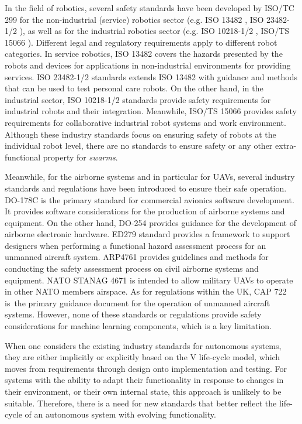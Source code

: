 \documentclass[sigconf]{acmart}
\begin{document}
 
In the field of robotics, several safety standards have been developed by ISO/TC 299 for the non-industrial (service) robotics sector (e.g. ISO 13482 \cite{ISO13482}, ISO 23482-1/2 \cite{ISO23482-1,ISO23482-2}), as well as for the industrial robotics sector (e.g. ISO 10218-1/2 \cite{ISO10218-1,ISO10218-2}, ISO/TS 15066 \cite{ISO15066}). 
Different legal and regulatory requirements apply to different robot categories. 
In service robotics, ISO 13482 covers the hazards presented by the robots and devices for applications in non-industrial environments for providing services. %
ISO 23482-1/2 standards extends ISO 13482 with guidance and methods that can be used to test personal care robots.
On the other hand, in the industrial sector, ISO 10218-1/2 standards provide safety requirements for industrial robots and their integration.
Meanwhile, ISO/TS 15066 provides safety requirements for collaborative industrial robot systems
and work environment. 
Although these industry standards focus on ensuring safety of robots at the individual robot level, there are no standards to ensure safety or any other extra-functional property for \textit{swarms}.

Meanwhile, for the airborne systems and in particular for UAVs, several industry standards and regulations have been introduced to ensure their safe operation. 
DO-178C \cite{DO-178C} is the primary standard for commercial avionics software development. It provides software considerations for the production of airborne systems and equipment. On the other hand, DO-254 \cite{DO-254} provides guidance for the development of airborne electronic hardware. ED279 \cite{ED279} standard provides a framework to support designers when performing a functional hazard assessment process for an unmanned aircraft system. 
ARP4761 \cite{ARP4761} provides guidelines and methods for conducting the safety assessment process on civil airborne systems and equipment. 
NATO STANAG 4671 \cite{STANAG4761} is intended to allow military UAVs to operate in other NATO members airspace. 
As for regulations within the UK, CAP 722 \cite{CAP722} is the primary guidance document for the operation of unmanned aircraft systems. 
However, none of these standards or regulations provide safety considerations for machine learning components, which is a key limitation.

When one considers the existing industry standards for autonomous systems, they are either implicitly or explicitly based on the V life-cycle model, which moves from requirements through design onto implementation and testing. 
For systems with the ability to adapt their functionality in response to changes in their environment, or their own internal state, this approach is unlikely to be suitable. 
Therefore, there is a need for new standards that better reflect the life-cycle of an autonomous system with evolving functionality.
\end{document}
